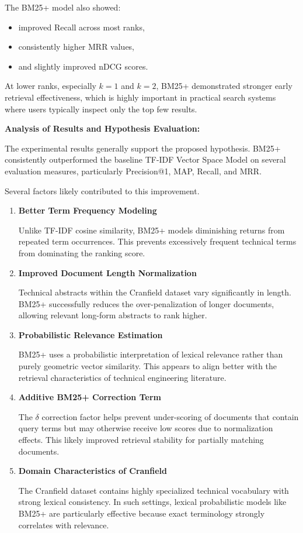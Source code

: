\documentclass{article}
\begin{document}
The BM25+ model also showed:
\begin{itemize}
    \item improved Recall across most ranks,
    \item consistently higher MRR values,
    \item and slightly improved nDCG scores.
\end{itemize}

At lower ranks, especially \(k=1\) and \(k=2\), BM25+ demonstrated stronger early retrieval effectiveness, which is highly important in practical search systems where users typically inspect only the top few results.

\textbf{Analysis of Results and Hypothesis Evaluation:}

The experimental results generally support the proposed hypothesis. BM25+ consistently outperformed the baseline TF-IDF Vector Space Model on several evaluation measures, particularly Precision@1, MAP, Recall, and MRR.

Several factors likely contributed to this improvement.

\begin{enumerate}
    \item \textbf{Better Term Frequency Modeling}

    Unlike TF-IDF cosine similarity, BM25+ models diminishing returns from repeated term occurrences. This prevents excessively frequent technical terms from dominating the ranking score.

    \item \textbf{Improved Document Length Normalization}

    Technical abstracts within the Cranfield dataset vary significantly in length. BM25+ successfully reduces the over-penalization of longer documents, allowing relevant long-form abstracts to rank higher.

    \item \textbf{Probabilistic Relevance Estimation}

    BM25+ uses a probabilistic interpretation of lexical relevance rather than purely geometric vector similarity. This appears to align better with the retrieval characteristics of technical engineering literature.

    \item \textbf{Additive BM25+ Correction Term}

    The \(\delta\) correction factor helps prevent under-scoring of documents that contain query terms but may otherwise receive low scores due to normalization effects. This likely improved retrieval stability for partially matching documents.

    \item \textbf{Domain Characteristics of Cranfield}

    The Cranfield dataset contains highly specialized technical vocabulary with strong lexical consistency. In such settings, lexical probabilistic models like BM25+ are particularly effective because exact terminology strongly correlates with relevance.
\end{enumerate}
\end{document}
